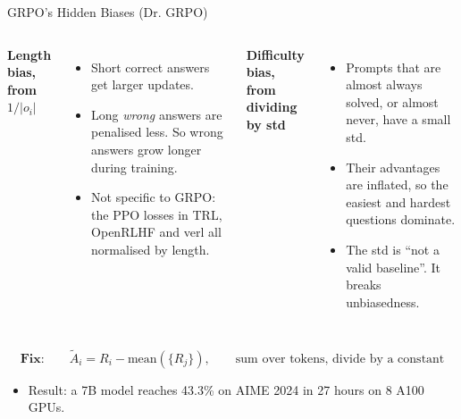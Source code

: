 \begin{frame}{GRPO's Hidden Biases (Dr. GRPO)}
    \begin{columns}[T,onlytextwidth]
        \textbf{Length bias, from $1/|o_i|$}
        \begin{itemize}\itemsep0.35em
            \item Short correct answers get larger updates.
            \item Long \emph{wrong} answers are penalised less. So wrong answers grow longer during training.
            \item Not specific to GRPO: the PPO losses in TRL, OpenRLHF and verl all normalised by length.
        \end{itemize}
        \textbf{Difficulty bias, from dividing by std}
        \begin{itemize}\itemsep0.35em
            \item Prompts that are almost always solved, or almost never, have a small std.
            \item Their advantages are inflated, so the easiest and hardest questions dominate.
            \item The std is ``not a valid baseline''. It breaks unbiasedness.
        \end{itemize}
    \end{columns}
    \vspace{0.5em}
    \[
        \textbf{Fix:}\qquad \tilde A_i = R_i-\mathrm{mean}(\{R_j\}), \qquad \text{sum over tokens, divide by a constant}
    \]
    \begin{itemize}\itemsep0.35em
        \item Result: a 7B model reaches 43.3\% on AIME 2024 in 27 hours on 8 A100 GPUs.
    \end{itemize}
\end{frame}

